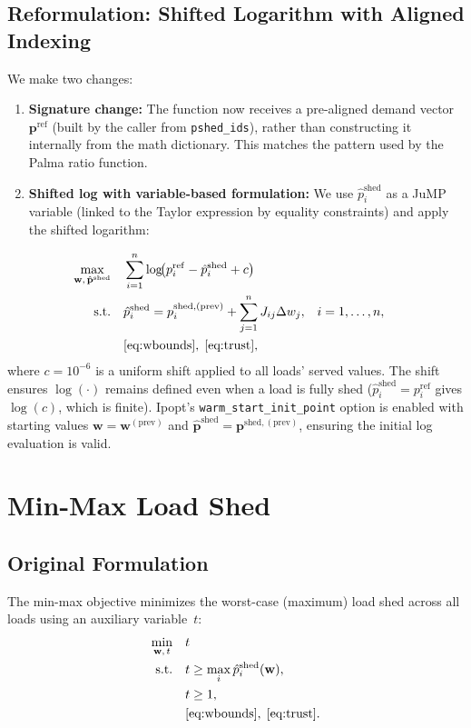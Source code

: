 \documentclass[11pt]{article}
\begin{document}
\subsection{Reformulation: Shifted Logarithm with Aligned Indexing}

We make two changes:
\begin{enumerate}
    \item \textbf{Signature change:} The function now receives a pre-aligned demand vector $\mathbf{p}^{\mathrm{ref}}$ (built by the caller from \texttt{pshed\_ids}), rather than constructing it internally from the math dictionary. This matches the pattern used by the Palma ratio function.
    \item \textbf{Shifted log with variable-based formulation:} We use $\hat{p}_i^{\mathrm{shed}}$ as a JuMP variable (linked to the Taylor expression by equality constraints) and apply the shifted logarithm:
\end{enumerate}
\begin{align}
    \max_{\mathbf{w},\,\hat{\mathbf{p}}^{\mathrm{shed}}} \quad & \sum_{i=1}^{n} \log\!\bigl(p_i^{\mathrm{ref}} - \hat{p}_i^{\mathrm{shed}} + c\bigr) \\
    \text{s.t.} \quad
    & \hat{p}_i^{\mathrm{shed}} = p_i^{\mathrm{shed,(prev)}} + \sum_{j=1}^{n} J_{ij} \Delta w_j, & i &= 1,\dots,n, \\
    & \eqref{eq:wbounds},\;\eqref{eq:trust}, \notag
\end{align}
where $c = 10^{-6}$ is a uniform shift applied to all loads' served values.
The shift ensures $\log(\cdot)$ remains defined even when a load is fully shed ($\hat{p}_i^{\mathrm{shed}} = p_i^{\mathrm{ref}}$ gives $\log(c)$, which is finite).
Ipopt's \texttt{warm\_start\_init\_point} option is enabled with starting values $\mathbf{w} = \mathbf{w}^{\mathrm{(prev)}}$ and $\hat{\mathbf{p}}^{\mathrm{shed}} = \mathbf{p}^{\mathrm{shed,(prev)}}$, ensuring the initial log evaluation is valid.

\section{Min-Max Load Shed}\label{sec:minmax}

\subsection{Original Formulation}

The min-max objective minimizes the worst-case (maximum) load shed across all loads using an auxiliary variable~$t$:
\begin{align}
    \min_{\mathbf{w},\,t} \quad & t \\
    \text{s.t.} \quad
    & t \ge \max_i \hat{p}_i^{\mathrm{shed}}(\mathbf{w}), \label{eq:mm-max}\\
    & t \ge 1, \notag \\
    & \eqref{eq:wbounds},\;\eqref{eq:trust}. \notag
\end{align}
\end{document}

